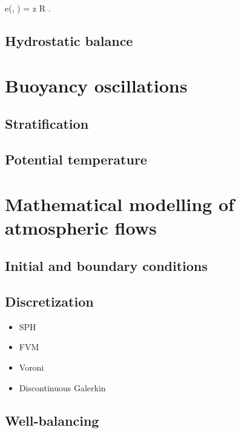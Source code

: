 \documentclass[../main.tex]{subfiles}
\begin{document}
\begin{equations}[single,*]
e\left(\rho, \theta\right) = z R \theta.
\end{equations}

\subsection{Hydrostatic balance}
\label{sec:HYDROSTATICS}

\section{Buoyancy oscillations}
\label{sec:BUYOANCY}

\subsection{Stratification}
\label{sec:STRATIFICATION}

\subsection{Potential temperature}
\label{sec:POTENTIAL_TEMP}


\section{Mathematical modelling of atmospheric flows}
\label{sec:MODELLING}

\subsection{Initial and boundary conditions}
\label{sec:IBCONDITIONS}

\subsection{Discretization}
\label{sec:DISCRETIZATION}

\begin{itemize}
	\item SPH
	\item FVM
	\item Voroni
	\item Discontinuous Galerkin
\end{itemize}

\subsection{Well-balancing}
\label{sec:WELL_BALANCING}
\end{document}
